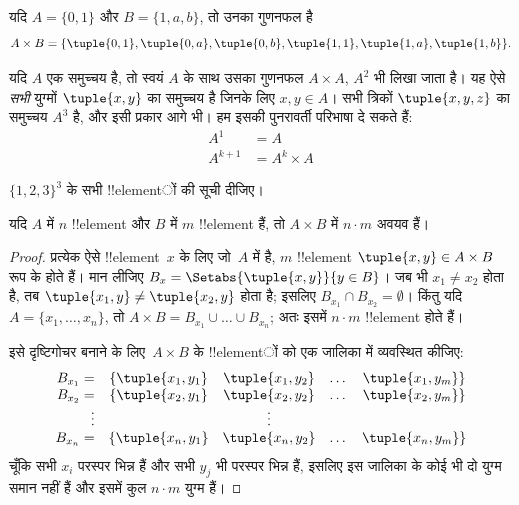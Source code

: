 \documentclass[../../../include/open-logic-section]{subfiles}
\begin{document}
\begin{ex}
यदि $A = \{0, 1\}$ और $B = \{1, a, b\}$, तो उनका गुणनफल है
\[
A \times B = \{ \tuple{0, 1}, \tuple{0, a}, \tuple{0, b},
    \tuple{1, 1}, \tuple{1, a}, \tuple{1, b} \}.
\]
\end{ex}

\begin{ex}
यदि $A$ एक समुच्चय है, तो स्वयं $A$ के साथ उसका गुणनफल $A \times A$,
$A^2$ भी लिखा जाता है। यह ऐसे \emph{सभी} युग्मों $\tuple{x, y}$ का
समुच्चय है जिनके लिए $x, y \in A$। सभी त्रिकों $\tuple{x, y, z}$ का
समुच्चय $A^3$ है, और इसी प्रकार आगे भी। हम इसकी पुनरावर्ती परिभाषा दे
सकते हैं:
\begin{align*}
  A^1 & = A\\
  A^{k+1} & = A^k \times A
\end{align*}
\end{ex}

\begin{prob}
$\{1, 2, 3\}^3$ के सभी !!{element}ों की सूची दीजिए।
\end{prob}

\begin{prop}
यदि $A$ में $n$ !!{element} और $B$ में $m$ !!{element} हैं, तो $A
\times B$ में $n\cdot m$ अवयव हैं।
\end{prop}

\begin{proof}
प्रत्येक ऐसे !!{element}~$x$ के लिए जो~$A$ में है, $m$ !!{element}
$\tuple{x, y} \in A \times B$ रूप के होते हैं। मान लीजिए
$B_x = \Setabs{\tuple{x, y}}{y
  \in B}$। जब भी $x_1 \neq x_2$ होता है, तब
$\tuple{x_1, y} \neq
\tuple{x_2, y}$ होता है; इसलिए $B_{x_1} \cap B_{x_2} = \emptyset$। किंतु
यदि $A = \{x_1,
\dots, x_n\}$, तो $A \times B = B_{x_1} \cup \dots \cup B_{x_n}$;
अतः इसमें $n\cdot m$ !!{element} होते हैं।

इसे दृष्टिगोचर बनाने के लिए~$A \times B$ के !!{element}ों को एक जालिका
में व्यवस्थित कीजिए:
\[
\begin{array}{rcccc}
  B_{x_1} = & \{\tuple{x_1, y_1} & \tuple{x_1, y_2} & \dots & \tuple{x_1, y_m}\}\\
  B_{x_2} = & \{\tuple{x_2, y_1} & \tuple{x_2, y_2} & \dots & \tuple{x_2, y_m}\}\\
  \vdots & & \vdots\\
  B_{x_n} = & \{\tuple{x_n, y_1} & \tuple{x_n, y_2} & \dots & \tuple{x_n, y_m}\}
\end{array}
\]
चूँकि सभी $x_i$ परस्पर भिन्न हैं और सभी $y_j$ भी परस्पर भिन्न हैं, इसलिए
इस जालिका के कोई भी दो युग्म समान नहीं हैं और इसमें कुल $n\cdot m$ युग्म
हैं।
\end{proof}
\end{document}
